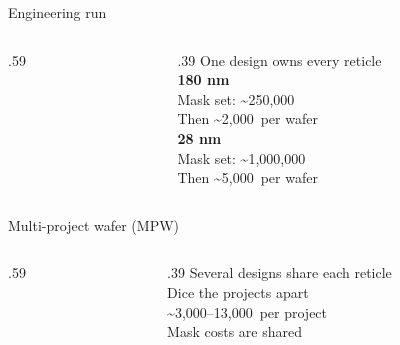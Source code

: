 \begin{frame}{Engineering run}
\begin{columns}[c,onlytextwidth]
\begin{column}{.59\textwidth}\centering{}\par\waferlegend\end{column}
\begin{column}{.39\textwidth}
{\Large\textcolor{NordPurple}{One design owns every reticle}}\\[12pt]
{\normalsize\bfseries 180 nm}\\[4pt]
{\small Mask set: \textasciitilde{}250,000\,\texteuro}\\[3pt]
{\small Then \textasciitilde{}2,000\,\texteuro{} per wafer}\\[11pt]
{\normalsize\bfseries 28 nm}\\[4pt]
{\small Mask set: \textasciitilde{}1,000,000\,\texteuro}\\[3pt]
{\small Then \textasciitilde{}5,000\,\texteuro{} per wafer}
\end{column}
\end{columns}
\end{frame}

\begin{frame}{Multi-project wafer (MPW)}
\begin{columns}[c,onlytextwidth]
\begin{column}{.59\textwidth}\centering{}\par\waferlegend\end{column}
\begin{column}{.39\textwidth}
{\Large\textcolor{NordPurple}{Several designs share each reticle}}\\[15pt]
{\large Dice the projects apart}\\[18pt]
{\small \textasciitilde{}3,000--13,000\,\texteuro{} per project}\\[7pt]
{\small Mask costs are shared}
\end{column}
\end{columns}
\end{frame}

